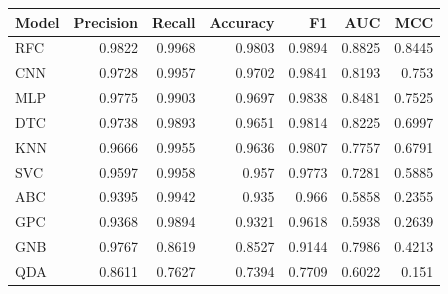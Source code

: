 \begin{tabular}{lrrrrrr}
\toprule
Model & Precision & Recall & Accuracy & F1 & AUC & MCC \\
\midrule
RFC & 0.9822 & 0.9968 & 0.9803 & 0.9894 & 0.8825 & 0.8445 \\
CNN & 0.9728 & 0.9957 & 0.9702 & 0.9841 & 0.8193 & 0.753 \\
MLP & 0.9775 & 0.9903 & 0.9697 & 0.9838 & 0.8481 & 0.7525 \\
DTC & 0.9738 & 0.9893 & 0.9651 & 0.9814 & 0.8225 & 0.6997 \\
KNN & 0.9666 & 0.9955 & 0.9636 & 0.9807 & 0.7757 & 0.6791 \\
SVC & 0.9597 & 0.9958 & 0.957 & 0.9773 & 0.7281 & 0.5885 \\
ABC & 0.9395 & 0.9942 & 0.935 & 0.966 & 0.5858 & 0.2355 \\
GPC & 0.9368 & 0.9894 & 0.9321 & 0.9618 & 0.5938 & 0.2639 \\
GNB & 0.9767 & 0.8619 & 0.8527 & 0.9144 & 0.7986 & 0.4213 \\
QDA & 0.8611 & 0.7627 & 0.7394 & 0.7709 & 0.6022 & 0.151 \\
\bottomrule
\end{tabular}

